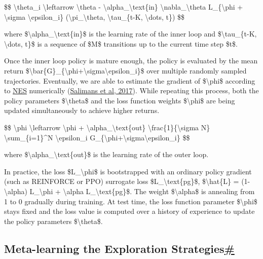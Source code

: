 \$\$ \textbackslash theta\_i \textbackslash leftarrow \textbackslash theta - \textbackslash alpha\_\textbackslash text\{in\} \textbackslash nabla\_\textbackslash theta L\_\{\textbackslash phi + \textbackslash sigma \textbackslash epsilon\_i\} (\textbackslash pi\_\textbackslash theta, \textbackslash tau\_\{t-K, \textbackslash dots, t\}) \$\$

where \$\textbackslash alpha\_\textbackslash text\{in\}\$ is the learning rate of the inner loop and \$\textbackslash tau\_\{t-K, \textbackslash dots, t\}\$ is a sequence of \$M\$ transitions up to the current time step \$t\$.

Once the inner loop policy is mature enough, the policy is evaluated by the mean return \$\textbackslash bar\{G\}\_\{\textbackslash phi+\textbackslash sigma\textbackslash epsilon\_i\}\$ over multiple randomly sampled trajectories. Eventually, we are able to estimate the gradient of \$\textbackslash phi\$ according to \href{http://blog.otoro.net/2017/10/29/visual-evolution-strategies/}{NES} numerically (\href{https://arxiv.org/abs/1703.03864}{Salimans et al, 2017}). While repeating this process, both the policy parameters \$\textbackslash theta\$ and the loss function weights \$\textbackslash phi\$ are being updated simultaneously to achieve higher returns.

\$\$ \textbackslash phi \textbackslash leftarrow \textbackslash phi + \textbackslash alpha\_\textbackslash text\{out\} \textbackslash frac\{1\}\{\textbackslash sigma N\} \textbackslash sum\_\{i=1\}\^{}N \textbackslash epsilon\_i G\_\{\textbackslash phi+\textbackslash sigma\textbackslash epsilon\_i\} \$\$

where \$\textbackslash alpha\_\textbackslash text\{out\}\$ is the learning rate of the outer loop.

In practice, the loss \$L\_\textbackslash phi\$ is bootstrapped with an ordinary policy gradient (such as REINFORCE or PPO) surrogate loss \$L\_\textbackslash text\{pg\}\$, \$\textbackslash hat\{L\} = (1-\textbackslash alpha) L\_\textbackslash phi + \textbackslash alpha L\_\textbackslash text\{pg\}\$. The weight \$\textbackslash alpha\$ is annealing from 1 to 0 gradually during training. At test time, the loss function parameter \$\textbackslash phi\$ stays fixed and the loss value is computed over a history of experience to update the policy parameters \$\textbackslash theta\$.

\subsection{\texorpdfstring{Meta-learning the Exploration Strategies\hyperref[meta-learning-the-exploration-strategies]{\#}}{Meta-learning the Exploration Strategies\#}}\label{meta-learning-the-exploration-strategies}

